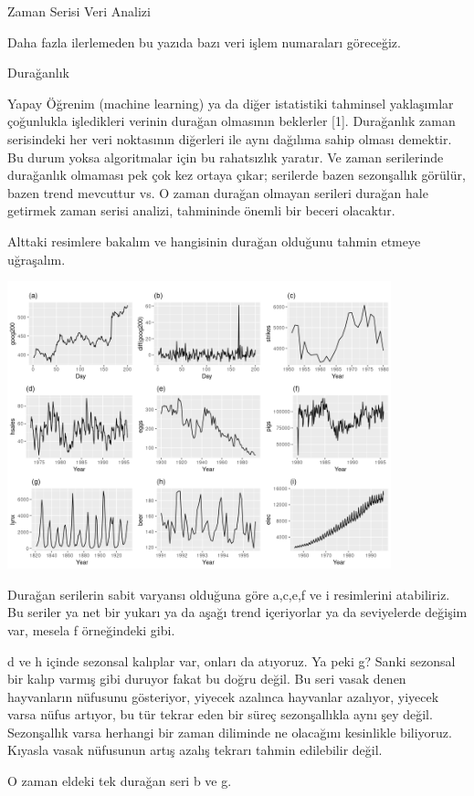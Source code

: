 \documentclass[12pt,fleqn]{article}\usepackage{../../common}
\begin{document}
Zaman Serisi Veri Analizi

Daha fazla ilerlemeden bu yazıda bazı veri işlem numaraları göreceğiz.

Durağanlık

Yapay Öğrenim (machine learning) ya da diğer istatistiki tahminsel yaklaşımlar
çoğunlukla işledikleri verinin durağan olmasının beklerler [1]. Durağanlık zaman
serisindeki her veri noktasının diğerleri ile aynı dağılıma sahip olması
demektir. Bu durum yoksa algoritmalar için bu rahatsızlık yaratır. Ve zaman
serilerinde durağanlık olmaması pek çok kez ortaya çıkar; serilerde bazen
sezonşallık görülür, bazen trend mevcuttur vs. O zaman durağan olmayan serileri
durağan hale getirmek zaman serisi analizi, tahmininde önemli bir beceri
olacaktır.

Alttaki resimlere bakalım ve hangisinin durağan olduğunu tahmin etmeye
uğraşalım. 

\includegraphics[width=30em]{tser_008_data_01.png}

Durağan serilerin sabit varyansı olduğuna göre a,c,e,f ve i resimlerini
atabiliriz. Bu seriler ya net bir yukarı ya da aşağı trend içeriyorlar ya
da seviyelerde değişim var, mesela f örneğindeki gibi.

d ve h içinde sezonsal kalıplar var, onları da atıyoruz. Ya peki g?  Sanki
sezonsal bir kalıp varmış gibi duruyor fakat bu doğru değil.  Bu seri vasak
denen hayvanların nüfusunu gösteriyor, yiyecek azalınca hayvanlar azalıyor,
yiyecek varsa nüfus artıyor, bu tür tekrar eden bir süreç sezonşallıkla aynı şey
değil. Sezonşallık varsa herhangi bir zaman diliminde ne olacağını kesinlikle
biliyoruz. Kıyasla vasak nüfusunun artış azalış tekrarı tahmin edilebilir
değil.

O zaman eldeki tek durağan seri b ve g.
\end{document}
